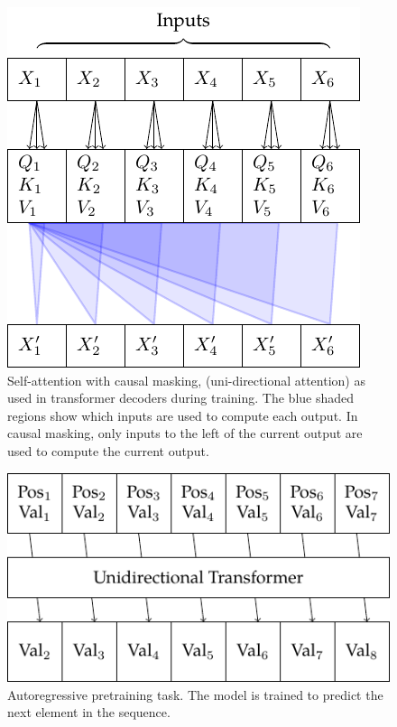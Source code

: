 \begin{figure}
    \centering
    \includegraphics[]{figures/attn-3-causal.pdf}
    \caption[Self-attention with causal masking]{Self-attention with causal masking, (uni-directional attention) as used in transformer decoders during training. The blue shaded regions show which inputs are used to compute each output. In causal masking, only inputs to the left of the current output are used to compute the current output.}
    \label{fig:self-attn-causal}
\end{figure}

\begin{figure}
    \centering
    \includegraphics{figures/pretraining-causal.pdf}
    \caption[Autoregressive Sequence Modeling Pretraining]{Autoregressive pretraining task. The model is trained to predict the next element in the sequence.}
    \label{fig:pretraining-causal}
\end{figure}

